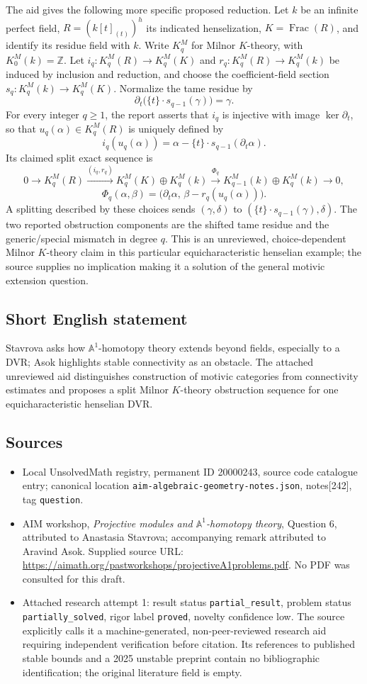 \documentclass[11pt]{article}
\newcommand{\Z}{\mathbb{Z}}
\newcommand{\A}{\mathbb{A}}
\begin{document}
The aid gives the following more specific proposed reduction. Let $k$ be an infinite perfect field, $R=(k[t]_{(t)})^h$ its indicated henselization, $K=\operatorname{Frac}(R)$, and identify its residue field with $k$. Write $K_q^M$ for Milnor $K$-theory, with $K_0^M(k)=\Z$. Let $i_q:K_q^M(R)\to K_q^M(K)$ and $r_q:K_q^M(R)\to K_q^M(k)$ be induced by inclusion and reduction, and choose the coefficient-field section $s_q:K_q^M(k)\to K_q^M(K)$. Normalize the tame residue by
\[\partial_t\bigl(\{t\}\cdot s_{q-1}(\gamma)\bigr)=\gamma.\]
For every integer $q\ge1$, the report asserts that $i_q$ is injective with image $\ker\partial_t$, so that $u_q(\alpha)\in K_q^M(R)$ is uniquely defined by
\[i_q(u_q(\alpha))=\alpha-\{t\}\cdot s_{q-1}(\partial_t\alpha).\]
Its claimed split exact sequence is
\[0\longrightarrow K_q^M(R)\xrightarrow{(i_q,r_q)}K_q^M(K)\oplus K_q^M(k)\xrightarrow{\Phi_q}K_{q-1}^M(k)\oplus K_q^M(k)\longrightarrow0,\]
\[\Phi_q(\alpha,\beta)=\bigl(\partial_t\alpha,\,\beta-r_q(u_q(\alpha))\bigr).\]
A splitting described by these choices sends $(\gamma,\delta)$ to $(\{t\}\cdot s_{q-1}(\gamma),\delta)$. The two reported obstruction components are the shifted tame residue and the generic/special mismatch in degree $q$. This is an unreviewed, choice-dependent Milnor $K$-theory claim in this particular equicharacteristic henselian example; the source supplies no implication making it a solution of the general motivic extension question.
\subsection{Short English statement}
Stavrova asks how $\A^1$-homotopy theory extends beyond fields, especially to a DVR; Asok highlights stable connectivity as an obstacle. The attached unreviewed aid distinguishes construction of motivic categories from connectivity estimates and proposes a split Milnor $K$-theory obstruction sequence for one equicharacteristic henselian DVR.
\subsection{Sources}
\begin{itemize}
\item Local UnsolvedMath registry, permanent ID 20000243, source code catalogue entry; canonical location \texttt{aim-algebraic-geometry-notes.json}, notes[242], tag \texttt{question}.
\item AIM workshop, \emph{Projective modules and $\A^1$-homotopy theory}, Question 6, attributed to Anastasia Stavrova; accompanying remark attributed to Aravind Asok. Supplied source URL: \url{https://aimath.org/pastworkshops/projectiveA1problems.pdf}. No PDF was consulted for this draft.
\item Attached research attempt 1: result status \texttt{partial\_result}, problem status \texttt{partially\_solved}, rigor label \texttt{proved}, novelty confidence low. The source explicitly calls it a machine-generated, non-peer-reviewed research aid requiring independent verification before citation. Its references to published stable bounds and a 2025 unstable preprint contain no bibliographic identification; the original literature field is empty.
\end{itemize}
\end{document}
